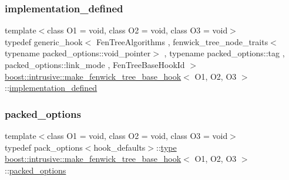 \subsubsection{\texorpdfstring{implementation\+\_\+defined}{implementation\_defined}}
{\footnotesize\ttfamily template$<$class O1 = void, class O2 = void, class O3 = void$>$ \\
typedef generic\+\_\+hook$<$ Fen\+Tree\+Algorithms , fenwick\+\_\+tree\+\_\+node\+\_\+traits$<$typename packed\+\_\+options\+::void\+\_\+pointer$>$ , typename packed\+\_\+options\+::tag , packed\+\_\+options\+::link\+\_\+mode , Fen\+Tree\+Base\+Hook\+Id $>$ \hyperlink{classboost_1_1intrusive_1_1make__fenwick__tree__base__hook}{boost\+::intrusive\+::make\+\_\+fenwick\+\_\+tree\+\_\+base\+\_\+hook}$<$ O1, O2, O3 $>$\+::\hyperlink{classboost_1_1intrusive_1_1make__fenwick__tree__base__hook_af661b0546c575716fb1fc71c0446929c}{implementation\+\_\+defined}}

\mbox{\label{classboost_1_1intrusive_1_1make__fenwick__tree__base__hook_af7deddd956f4b6beda854f8c98dcf637}} 
\subsubsection{\texorpdfstring{packed\+\_\+options}{packed\_options}}
{\footnotesize\ttfamily template$<$class O1 = void, class O2 = void, class O3 = void$>$ \\
typedef pack\+\_\+options$<$hook\+\_\+defaults$>$\+::\hyperlink{classboost_1_1intrusive_1_1make__fenwick__tree__base__hook_ac194b5544afb5fb14dca7765784c8eb7}{type} \hyperlink{classboost_1_1intrusive_1_1make__fenwick__tree__base__hook}{boost\+::intrusive\+::make\+\_\+fenwick\+\_\+tree\+\_\+base\+\_\+hook}$<$ O1, O2, O3 $>$\+::\hyperlink{classboost_1_1intrusive_1_1make__fenwick__tree__base__hook_af7deddd956f4b6beda854f8c98dcf637}{packed\+\_\+options}}

\mbox{\label{classboost_1_1intrusive_1_1make__fenwick__tree__base__hook_ac194b5544afb5fb14dca7765784c8eb7}} 
